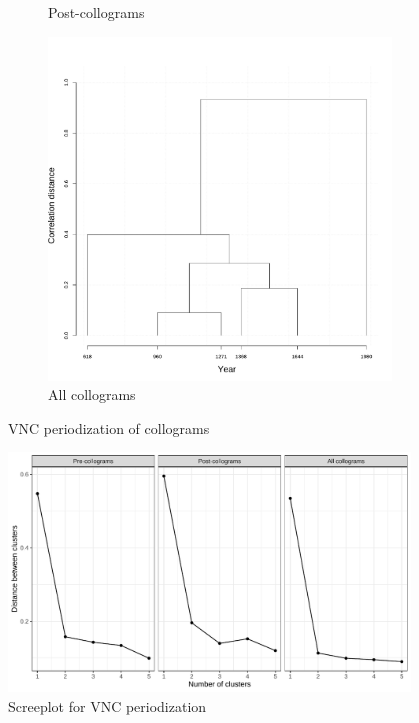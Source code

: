\begin{figure}[H]
\begin{subfigure}{0.3\textwidth}
    \caption{Post-collograms}
  \end{subfigure}
  \quad
  \begin{subfigure}{0.3\textwidth}
    \includegraphics[width=\linewidth]{figures_new/VNC_lanbox/all_collocate_df_VNC_cor.pdf}
    \caption{All collograms}
  \end{subfigure}
  \caption{VNC periodization of collograms}
\end{figure}

\begin{figure}[H]
  \centering
  \includegraphics[width=0.95\textwidth,keepaspectratio]{figures_new/VNC_lanbox/screeplot_collocate.pdf}
  \caption{Screeplot for VNC periodization}
\end{figure}

